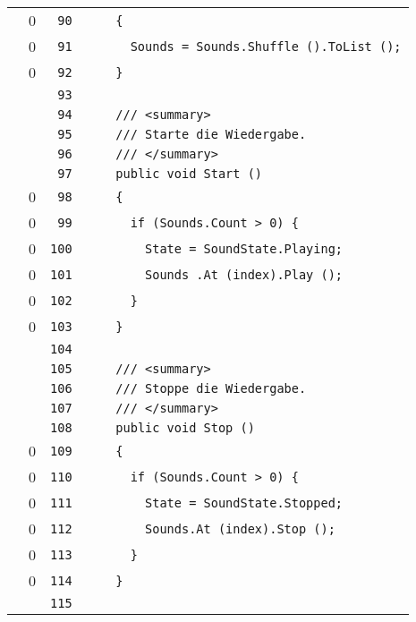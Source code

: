 \documentclass[a4paper,10pt]{article}
\begin{document}
\begin{longtable}[l]{lrrl}
\cellcolor{red} & 0 & \verb~90~ & \verb~    {~\\
\cellcolor{red} & 0 & \verb~91~ & \verb~      Sounds = Sounds.Shuffle ().ToList ();~\\
\cellcolor{red} & 0 & \verb~92~ & \verb~    }~\\
\cellcolor{gray} &  & \verb~93~ & \verb~~\\
\cellcolor{gray} &  & \verb~94~ & \verb~    /// <summary>~\\
\cellcolor{gray} &  & \verb~95~ & \verb~    /// Starte die Wiedergabe.~\\
\cellcolor{gray} &  & \verb~96~ & \verb~    /// </summary>~\\
\cellcolor{gray} &  & \verb~97~ & \verb~    public void Start ()~\\
\cellcolor{red} & 0 & \verb~98~ & \verb~    {~\\
\cellcolor{red} & 0 & \verb~99~ & \verb~      if (Sounds.Count > 0) {~\\
\cellcolor{red} & 0 & \verb~100~ & \verb~        State = SoundState.Playing;~\\
\cellcolor{red} & 0 & \verb~101~ & \verb~        Sounds .At (index).Play ();~\\
\cellcolor{red} & 0 & \verb~102~ & \verb~      }~\\
\cellcolor{red} & 0 & \verb~103~ & \verb~    }~\\
\cellcolor{gray} &  & \verb~104~ & \verb~~\\
\cellcolor{gray} &  & \verb~105~ & \verb~    /// <summary>~\\
\cellcolor{gray} &  & \verb~106~ & \verb~    /// Stoppe die Wiedergabe.~\\
\cellcolor{gray} &  & \verb~107~ & \verb~    /// </summary>~\\
\cellcolor{gray} &  & \verb~108~ & \verb~    public void Stop ()~\\
\cellcolor{red} & 0 & \verb~109~ & \verb~    {~\\
\cellcolor{red} & 0 & \verb~110~ & \verb~      if (Sounds.Count > 0) {~\\
\cellcolor{red} & 0 & \verb~111~ & \verb~        State = SoundState.Stopped;~\\
\cellcolor{red} & 0 & \verb~112~ & \verb~        Sounds.At (index).Stop ();~\\
\cellcolor{red} & 0 & \verb~113~ & \verb~      }~\\
\cellcolor{red} & 0 & \verb~114~ & \verb~    }~\\
\cellcolor{gray} &  & \verb~115~ & \verb~~\\

\end{longtable}
\end{document}
